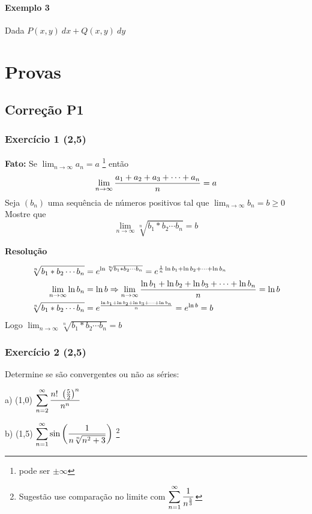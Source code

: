 \documentclass[12pt,openany, letterpaper]{book}
\newcommand{\LI}[1][n]{\lim_{{#1} \rightarrow \infty}}
\newcommand{\soma}[2][n]{\sum_{{#1} = #2}^\infty}
\newcommand{\E}[1]{Exercício #1}
\newcommand{\Resolve}{\begin{center} \textbf{Resolução} \end{center}}
\begin{document}
{{\subsection*{Exemplo 3}

\hspace{5mm} Dada $P(x,y) \ dx + Q(x,y) \ dy$

\part{Provas}
\chapter{Correção P1}
\label{C:P1}

\section*{\E{1} (2,5)}{\textbf{Fato:} Se $\displaystyle{\LI a_n = a}$ \footnote{pode ser $\pm \infty$} então $$\LI {a_1 + a_2 + a_3 + \cdots + a_n \over n} = a$$ Seja $(b_n)$ uma sequência de números positivos tal que $\displaystyle{\LI b_n = b \geq 0}$ Mostre que $$\LI \sqrt[n]{b_1*b_2\cdots b_n} = b $$}

\Resolve

\begin{align*}
\sqrt[n]{b_1*b_2\cdots b_n} &= e^{\ln{\sqrt[n]{b_1*b_2\cdots b_n}}} = e^{{1 \over n} \ln{b_1} + \ln{b_2} + \cdots + \ln{b_n}}\\
\LI \ln{b_n} &= \ln{b} \Rightarrow \LI {\ln{b_1} + \ln{b_2} + \ln{b_3} + \cdots + \ln{b_n} \over n} = \ln{b} \\
\sqrt[n]{b_1*b_2\cdots b_n} &= e^{\ln{b_1} + \ln{b_2} + \ln{b_3} + \cdots + \ln{b_n} \over n} = e^{\ln{b}} = b \\
\end{align*}
Logo $\displaystyle{\LI \sqrt[n]{b_1*b_2\cdots b_n} = b}$

\newpage

\section*{\E{2} (2,5)} {Determine se são convergentes ou não as séries:}
\begin{multicols}{2}
a) (1,0) $\displaystyle{\soma{2} {n! \ \left({5 \over 2}\right)^n \over n^n}}$

b) (1,5) $\displaystyle{\soma{1} \sin{\left( {1 \over n \sqrt[n]{n^2 + 3}} \right)}}$ \footnote{Sugestão use comparação no limite com $\displaystyle{\soma{1} {1 \over n^{5 \over 3}}}$}
\end{multicols}

}}
\end{document}
